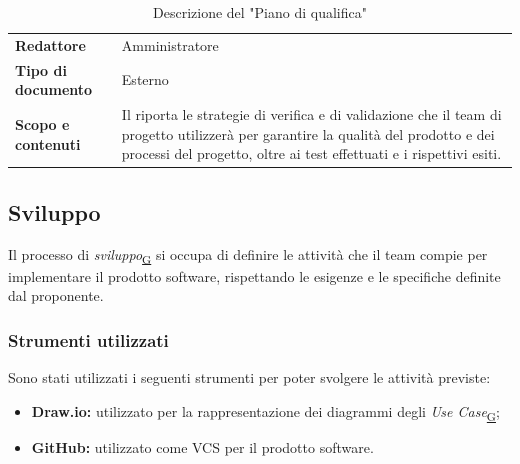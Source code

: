 \documentclass[a4paper,12pt]{article}
\begin{document}
{{{            {\renewcommand{\arraystretch}{1.4}
            \begin{table}[h]
            \centering
                \begin{tabularx}{\textwidth}{|l|X|}
                    \hline
                    \rowcolor{gold}
                    \multicolumn{2}{|c|}{\textbf{Piano di qualifica}}\\
                    \hline
                    \textbf{Redattore} & Amministratore\\
                    \hline
                    \textbf{Tipo di documento} & Esterno\\
                    \hline
                    \textbf{Scopo e contenuti} & Il riporta le strategie di verifica e di validazione che il team di progetto utilizzerà per garantire la qualità del prodotto e dei processi del progetto, oltre ai test effettuati e i rispettivi esiti.\\
                    \hline
                \end{tabularx}    
            \caption{Descrizione del "Piano di qualifica"}
            \end{table}
            }  
        }
    }
    
    \subsection{Sviluppo}
    \label{subsec:sviluppo}{
        Il processo di \textit{sviluppo}\textsubscript{\href{https://atlasteam9.github.io/Atlas/glossario.html\#Sviluppo}{G}} si occupa di definire le attività che il team compie per implementare il prodotto software, rispettando le esigenze e le specifiche definite dal proponente.

        \subsubsection{Strumenti utilizzati}{
            Sono stati utilizzati i seguenti strumenti per poter svolgere le attività previste:
            \begin{itemize}
                \item \textbf{Draw.io:} utilizzato per la rappresentazione dei diagrammi degli \textit{Use Case}\textsubscript{\href{https://atlasteam9.github.io/Atlas/glossario.html\#Usecase}{G}};
                \item \textbf{GitHub:} utilizzato come VCS per il prodotto software.
            \end{itemize}
        }

}}
\end{document}
